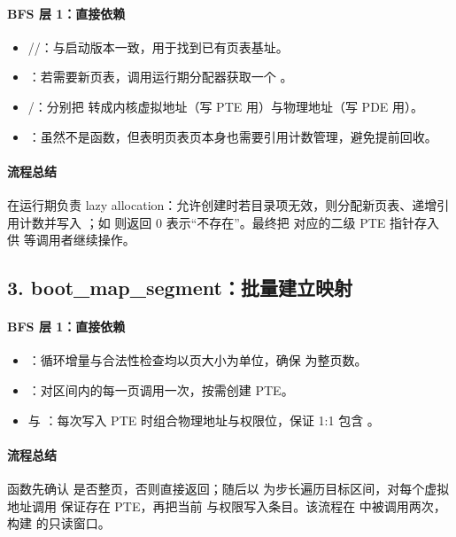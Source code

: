 \documentclass[12pt,oneside]{ctexbook}
\begin{document}
\paragraph{BFS 层 1：直接依赖}
\begin{itemize}
    \item {}//：与启动版本一致，用于找到已有页表基址。
    \item {}：若需要新页表，调用运行期分配器获取一个 。
    \item {}/：分别把  转成内核虚拟地址（写 PTE 用）与物理地址（写 PDE 用）。
    \item {}：虽然不是函数，但表明页表页本身也需要引用计数管理，避免提前回收。
\end{itemize}

\paragraph{流程总结}
 在运行期负责 lazy allocation：允许创建时若目录项无效，则分配新页表、递增引用计数并写入 ；如  则返回 0 表示“不存在”。最终把  对应的二级 PTE 指针存入  供  等调用者继续操作。

\subsection*{3. boot\_map\_segment：批量建立映射}

\paragraph{BFS 层 1：直接依赖}
\begin{itemize}
    \item {}：循环增量与合法性检查均以页大小为单位，确保  为整页数。
    \item {}：对区间内的每一页调用一次，按需创建 PTE。
    \item {} 与 ：每次写入 PTE 时组合物理地址与权限位，保证 1:1 包含 。
\end{itemize}

\paragraph{流程总结}
函数先确认  是否整页，否则直接返回；随后以  为步长遍历目标区间，对每个虚拟地址调用  保证存在 PTE，再把当前  与权限写入条目。该流程在  中被调用两次，构建  的只读窗口。
\end{document}
